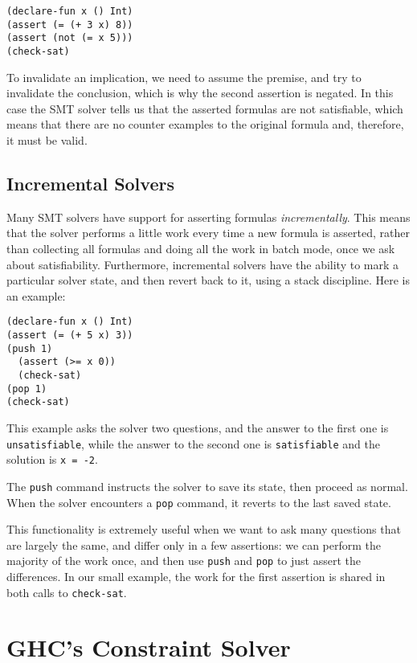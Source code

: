 \documentclass{sigplanconf}
\begin{document}
\begin{Verbatim}
(declare-fun x () Int)
(assert (= (+ 3 x) 8))
(assert (not (= x 5)))
(check-sat)
\end{Verbatim}

To invalidate an implication, we need to assume the premise, and try to
invalidate the conclusion, which is why the second assertion is negated.
In this case the SMT solver tells us that the asserted formulas are not
satisfiable, which means that there are no counter examples to the original
formula and, therefore, it must be valid.

\subsection{Incremental Solvers}

Many SMT solvers have support for asserting formulas {\em incrementally}.
This means that the solver performs a little work every time a new formula
is asserted, rather than collecting all formulas and doing all the work
in batch mode, once we ask about satisfiability.  Furthermore, incremental
solvers have the ability to mark a particular solver state, and then revert
back to it, using a stack discipline.  Here is an example:

\begin{Verbatim}
(declare-fun x () Int)
(assert (= (+ 5 x) 3))
(push 1)
  (assert (>= x 0))
  (check-sat)
(pop 1)
(check-sat)
\end{Verbatim}

This example asks the solver two questions, and the answer to the first
one is \Verb"unsatisfiable", while the answer to the second one is
\Verb"satisfiable" and the solution is \Verb"x = -2".

The \Verb"push" command instructs the solver to save its state, then
proceed as normal.  When the solver encounters a \Verb"pop" command,
it reverts to the last saved state.

This functionality is extremely useful when we want to ask many questions
that are largely the same, and differ only in a few assertions:
we can perform the majority of the work once, and then use
\Verb"push" and \Verb"pop" to just assert the differences.
In our small example, the work for the first assertion is shared in
both calls to \Verb"check-sat".





\section{GHC's Constraint Solver}
\label{GHC}
\end{document}
